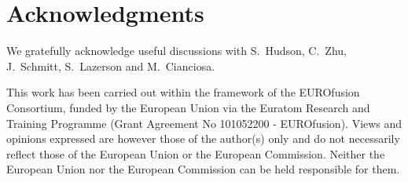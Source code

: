 \section{Acknowledgments}
\label{sec:acknowledgments}
We gratefully acknowledge useful discussions with
S.~Hudson, C.~Zhu, J.~Schmitt, S.~Lazerson and M.~Cianciosa.

This work has been carried out within the framework of the EUROfusion Consortium,
funded by the European Union via the Euratom Research and Training Programme (Grant Agreement No 101052200 - EUROfusion).
Views and opinions expressed are however those of the author(s) only
and do not necessarily reflect those of the European Union or the European Commission.
Neither the European Union nor the European Commission can be held responsible for them.
